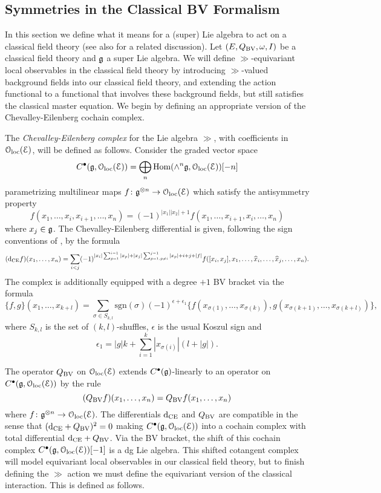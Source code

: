 \documentclass[10pt, oneside]{article}
\begin{document}
\subsection{Symmetries in the Classical BV Formalism} \label{symmetry_section}
In this section we define what it means for a (super) Lie algebra to act on a classical field theory  (see also \cite[Chapter 11]{Book2} for a related discussion). Let $(E, Q_{\mathrm{BV}},\omega, I)$ be a classical field theory and $\mathfrak g$ a super Lie algebra.  We will define $\gg$-equivariant local observables in the classical field theory by introducing $\gg$-valued background fields into our classical field theory, and extending the action functional to a functional that involves these background fields, but still satisfies the classical master equation.  We begin by defining an appropriate version of the Chevalley-Eilenberg cochain complex.

\begin{definition}
The \emph{Chevalley-Eilenberg complex} for the Lie algebra $\gg$, with coefficients in $\mathcal{O}_{\rm loc}(\mathcal E)$, will be defined as follows.  Consider the graded vector space
\[C^\bullet(\mathfrak g, \mathcal{O}_{\rm loc}(\mathcal E)) = \bigoplus_n \operatorname{Hom}(\wedge^n \mathfrak g, \mathcal{O}_{\rm loc}(\mathcal E))[-n]\]
parametrizing multilinear maps $f\colon \mathfrak g^{\otimes n}\rightarrow \mathcal{O}_{\rm loc}(\mathcal E)$ which satisfy the antisymmetry property
\[f(x_1, \dots, x_i, x_{i+1}, \dots, x_n) = (-1)^{|x_1||x_2|+1} f(x_1, \dots, x_{i+1}, x_i, \dots, x_n)\]
where $x_j \in \mathfrak g$.  The Chevalley-Eilenberg differential is given, following the sign conventions of \cite{SafronovCoisoInt}, by the formula
\[({\rm d}_{\mathrm{CE}} f)(x_1, \dots, x_n) = \sum_{i < j}(-1)^{|x_i| \sum_{p=1}^{i-1} |x_p| + |x_j| \sum_{p=1,p\neq i}^{j-1} |x_p| +i+j+|f|} f([x_i, x_j], x_1, \dots, \widehat{x}_i, \dots, \widehat{x}_j, \dots, x_n).\]
The complex is additionally equipped with a degree $+1$ BV bracket via the formula
\[\{f, g\}(x_1, \dots, x_{k+l}) = \sum_{\sigma\in S_{k, l}} \mathrm{sgn}(\sigma) (-1)^{\epsilon+\epsilon_1} \{f(x_{\sigma(1)}, \dots, x_{\sigma(k)}), g(x_{\sigma(k+1)}, \dots, x_{\sigma(k+l)})\},\]
where $S_{k, l}$ is the set of $(k, l)$-shuffles, $\epsilon$ is the usual Koszul sign and
\[\epsilon_1 = |g|k + \sum_{i=1}^k |x_{\sigma(i)}|(l+|g|).\]
\end{definition}

The operator $Q_{\mathrm{BV}}$ on $\mathcal{O}_{\rm loc}(\mathcal E)$ extends $C^\bullet(\mathfrak g)$-linearly to an operator on $C^\bullet(\mathfrak g, \mathcal{O}_{\rm loc}(\mathcal E))$ by the rule
\[
(Q_{\mathrm{BV}} f)(x_1,\ldots, x_n) = Q_{\mathrm{BV}} f(x_1,\ldots, x_n) 
\]
where $f \colon \mathfrak g^{\otimes n} \to \mathcal{O}_{\rm loc}(\mathcal E)$. 
The differentials ${\rm d}_{\mathrm{CE}}$ and $Q_{\mathrm{BV}}$ are compatible in the sense that $({\rm d}_{\mathrm{CE}} + Q_{\mathrm{BV}})^2 = 0$ making $C^\bullet(\mathfrak g, \mathcal{O}_{\rm loc}(\mathcal E))$ into a cochain complex with total differential ${\rm d}_{\mathrm{CE}} + Q_{\mathrm{BV}}$. 
Via the BV bracket, the shift of this cochain complex $C^\bullet(\mathfrak g, \mathcal{O}_{\rm loc}(\mathcal E))[-1]$ is a dg Lie algebra.  This shifted cotangent complex will model equivariant local observables in our classical field theory, but to finish defining the $\gg$ action we must define the equivariant version of the classical interaction.  This is defined as follows.
\end{document}
